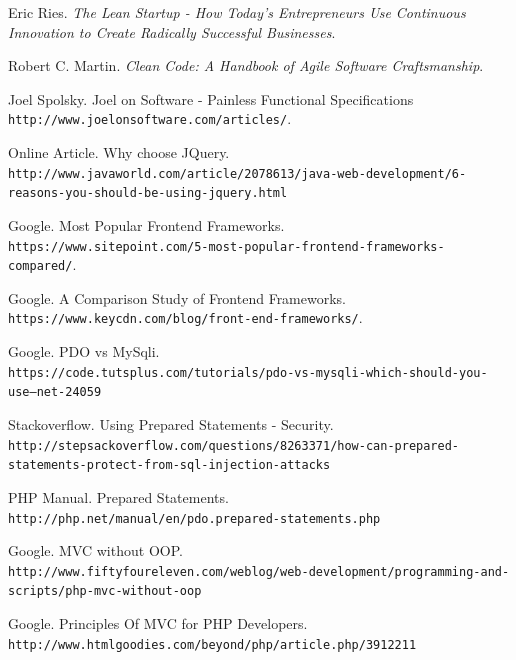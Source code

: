 \begin{thebibliography}{9}


Eric Ries. 
\textit{The Lean Startup - How Today's Entrepreneurs Use Continuous Innovation to Create Radically Successful Businesses}. 


Robert C. Martin.
\textit{Clean Code: A Handbook of Agile Software Craftsmanship}.

\bibitem{} 
Joel Spolsky. Joel on Software - Painless Functional Specifications
\\\texttt{http://www.joelonsoftware.com/articles/}.

\newcommand{\smallurl}[1]{{\footnotesize \texttt{#1}}}

\bibitem{} 
Online Article. Why choose JQuery.
\\\smallurl{http://www.javaworld.com/article/2078613/java-web-development/6-reasons-you-should-be-using-jquery.html}


\bibitem{} 
Google. Most Popular Frontend Frameworks.
\\\texttt{https://www.sitepoint.com/5-most-popular-frontend-frameworks-compared/}.

\bibitem{} 
Google. A Comparison Study of Frontend Frameworks.
\\\texttt{https://www.keycdn.com/blog/front-end-frameworks/}.

\bibitem{} 
Google. PDO vs MySqli.
\\\smallurl{https://code.tutsplus.com/tutorials/pdo-vs-mysqli-which-should-you-use--net-24059}

\bibitem{} 
Stackoverflow. Using Prepared Statements - Security.
\\\smallurl{http://stepsackoverflow.com/questions/8263371/how-can-prepared-statements-protect-from-sql-injection-attacks}

\bibitem{} 
PHP Manual. Prepared Statements.
\\\texttt{http://php.net/manual/en/pdo.prepared-statements.php}

\bibitem{} 
Google. MVC without OOP.
\\\texttt{http://www.fiftyfoureleven.com/weblog/web-development/programming-and-scripts/php-mvc-without-oop}


\bibitem{} 
Google. Principles Of MVC for PHP Developers.
\\\texttt{http://www.htmlgoodies.com/beyond/php/article.php/3912211}

\end{thebibliography}













 












